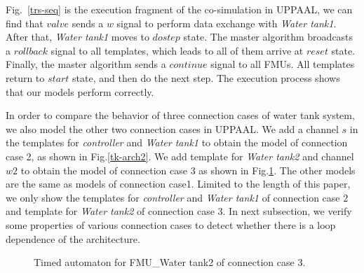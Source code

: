 Fig.~\ref{trs-seq} is the execution fragment of the co-simulation in UPPAAL, we can find that $valve$ sends a $w$ signal to perform data exchange with \emph{Water tank1}. After that, \emph{Water tank1}  moves to $dostep$ state. The master algorithm broadcasts a $rollback$ signal to all templates, which leads to all of them arrive at $reset$ state. Finally, the master algorithm sends a $continue$ signal to all FMUs. All templates return to $start$ state, and then do the next step. The execution process shows that our models perform correctly.

In order to compare the behavior of three connection cases of water tank system, we also model the other two connection cases in UPPAAL. We add a channel $s$ in the templates for \emph{controller} and \emph{Water tank1} to obtain the model of connection case 2, as shown in Fig.\ref{tk-arch2}. We add template for \emph{Water tank2} and channel $w2$ to obtain the model of connection case 3 as shown in Fig.\ref{arc3}. The other models are the same as models of connection case1. Limited to the length of this paper, we only show the templates for \emph{controller} and \emph{Water tank1} of connection case 2 and template for \emph{Water tank2} of connection case 3. In next subsection, we verify some properties of various connection cases to detect whether there is a loop dependence of the architecture.
\begin{figure}[htbp]
\end{figure}
\begin{figure}[htbp]
	\caption{Timed automaton for  FMU\_Water tank2 of connection case 3.}\label{arc3}
\end{figure}

